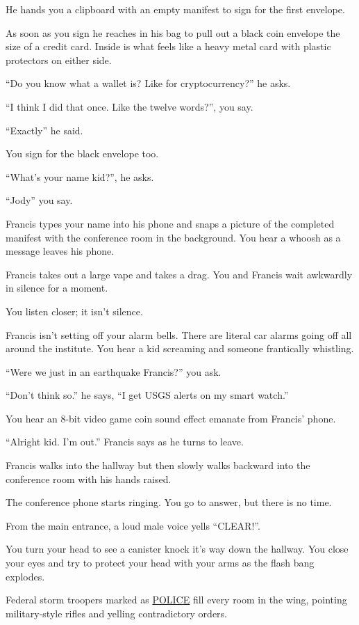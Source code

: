 \documentclass[17pt, twoside, a5paper, openright, extrafontsizes]{memoir}
\renewcommand{\emph}[1]{\ul{#1}}
\begin{document}
He hands you a clipboard with an empty manifest to sign for the first
envelope.

As soon as you sign he reaches in his bag to pull out a black coin
envelope the size of a credit card. Inside is what feels like a heavy
metal card with plastic protectors on either side.

``Do you know what a wallet is? Like for cryptocurrency?'' he asks.

``I think I did that once. Like the twelve words?'', you say.

``Exactly'' he said.

You sign for the black envelope too.

``What's your name kid?'', he asks.

``Jody'' you say.

Francis types your name into his phone and snaps a picture of the
completed manifest with the conference room in the background. You hear
a whoosh as a message leaves his phone.

Francis takes out a large vape and takes a drag. You and Francis wait
awkwardly in silence for a moment.

You listen closer; it isn't silence.

Francis isn't setting off your alarm bells. There are literal car alarms
going off all around the institute. You hear a kid screaming and someone
frantically whistling.

``Were we just in an earthquake Francis?'' you ask.

``Don't think so.'' he says, ``I get USGS alerts on my smart watch.''

You hear an 8-bit video game coin sound effect emanate from Francis'
phone.

``Alright kid. I'm out.'' Francis says as he turns to leave.

Francis walks into the hallway but then slowly walks backward into the
conference room with his hands raised.

The conference phone starts ringing. You go to answer, but there is no
time.

From the main entrance, a loud male voice yells ``CLEAR!''.

You turn your head to see a canister knock it's way down the hallway.
You close your eyes and try to protect your head with your arms as the
flash bang explodes.

Federal storm troopers marked as \emph{POLICE} fill every room in the
wing, pointing military-style rifles and yelling contradictory orders.
\end{document}
